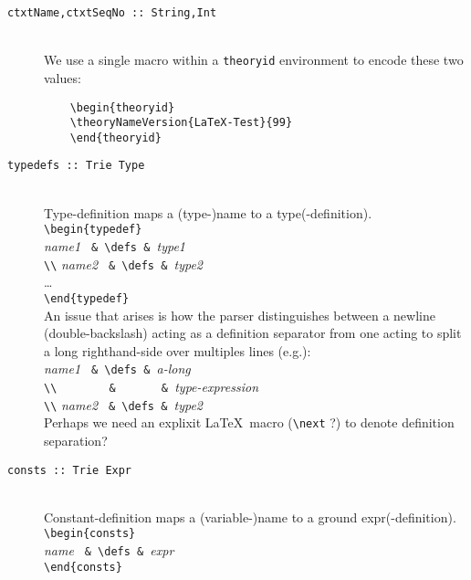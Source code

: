 \begin{description}
  \item[\texttt{ctxtName,ctxtSeqNo :: String,Int}]~\\
    We use a single macro within a \texttt{theoryid} environment
    to encode these two values:
    \begin{verbatim}
    \begin{theoryid}
    \theoryNameVersion{LaTeX-Test}{99}
    \end{theoryid}
    \end{verbatim}
  \item[\texttt{typedefs :: Trie Type}]~\\
    Type-definition maps a (type-)name to a type(-definition).
    \\\verb"\begin{typedef}"
    \\ \phantom{mm}\textit{\textsf{name1}} \verb" & \defs & "\textit{\textsf{type1}}
    \\ \verb"\\" \textit{\textsf{  name2}} \verb" & \defs & "\textit{\textsf{type2}}
    \\ \ldots
    \\\verb"\end{typedef}"
    \\ An issue that arises is how the parser distinguishes between
    a newline (double-backslash) acting as a definition separator
    from one acting to split a long righthand-side over multiples lines (e.g.):
    \\ \phantom{mm}\textit{\textsf{name1}} \verb" & \defs & "\textit{\textsf{a-long}}
    \\ \verb"\\        &       & "\textit{\textsf{type-expression}}
    \\ \verb"\\" \textit{\textsf{  name2}} \verb" & \defs & "\textit{\textsf{type2}}
    \\ Perhaps we need an explixit \LaTeX\ macro (\verb"\next" ?)
    to denote definition separation?
  \item[\texttt{consts :: Trie Expr}]~\\
    Constant-definition maps a (variable-)name to a ground expr(-definition).
    \\\verb"\begin{consts}"
    \\ \phantom{mm}\textit{\textsf{name}} \verb" & \defs & "\textit{\textsf{expr}}
    \\\verb"\end{consts}"

\end{description}
